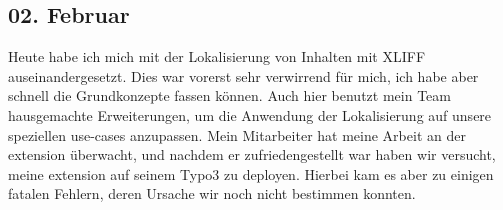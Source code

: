 \subsection{02. Februar}
Heute habe ich mich mit der Lokalisierung von Inhalten mit XLIFF auseinandergesetzt. Dies war vorerst sehr verwirrend für mich, ich habe aber schnell die Grundkonzepte fassen können. Auch hier benutzt mein Team hausgemachte Erweiterungen, um die Anwendung der Lokalisierung auf unsere speziellen use-cases anzupassen. Mein Mitarbeiter hat meine Arbeit an der extension überwacht, und nachdem er zufriedengestellt war haben wir versucht, meine extension auf seinem Typo3 zu deployen. Hierbei kam es aber zu einigen fatalen Fehlern, deren Ursache wir noch nicht bestimmen konnten.